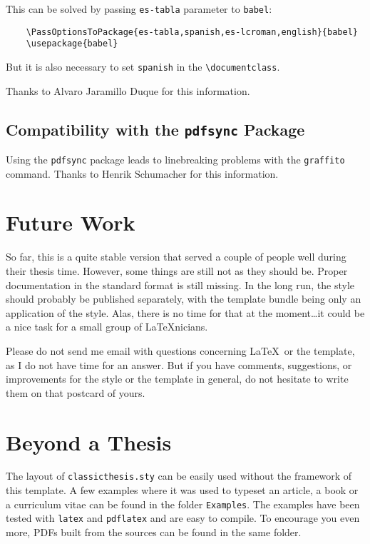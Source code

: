 This can be solved by passing \texttt{es-tabla} parameter to \texttt{babel}:
\begin{lstlisting}
    \PassOptionsToPackage{es-tabla,spanish,es-lcroman,english}{babel}
    \usepackage{babel}
\end{lstlisting}

But it is also necessary to set \texttt{spanish} in the \verb|\documentclass|.

Thanks to Alvaro Jaramillo Duque for this information. 

\subsection*{Compatibility with the \texttt{pdfsync} Package}
Using the \texttt{pdfsync} package leads to linebreaking problems with the \texttt{graffito} command. Thanks to Henrik Schumacher for this information. 


\section{Future Work}
So far, this is a quite stable version that served a couple of people well during their thesis time. However, some things are still not as they should be. Proper documentation in the standard format is still missing. In the long run, the style should probably be published separately, with the template bundle being only an application of the style. Alas, there is no time for that at the moment\dots it could be a nice task for a small group of \LaTeX nicians.

Please do not send me email with questions concerning \LaTeX\ or the template, as I do not have time for an answer. But if you have comments, suggestions, or improvements for the style or the template in general, do not hesitate to write them on that postcard of yours.


\section{Beyond a Thesis}
The layout of \texttt{classicthesis.sty} can be easily used without the framework of this template. A few examples where it was used to typeset an article, a book or a curriculum vitae can be found in the folder \texttt{Examples}. The examples have been tested with \texttt{latex} and \texttt{pdflatex} and are easy to compile. To encourage you even more, PDFs built from the sources can be found in the same folder.

